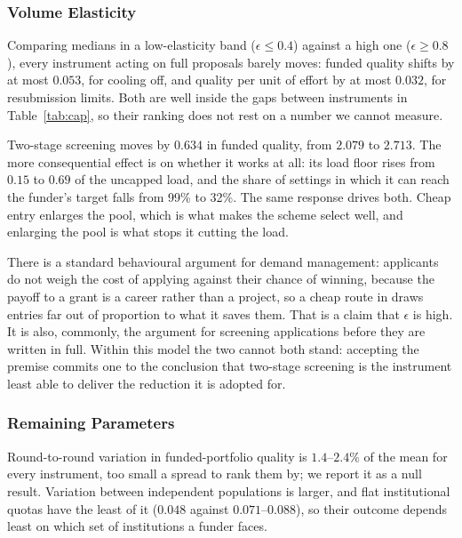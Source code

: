\documentclass[11pt,a4paper]{article}
\begin{document}
\subsubsection{Volume Elasticity}

Comparing medians in a low-elasticity band ($\epsilon \le 0.4$) against a high one
($\epsilon \ge 0.8$), every instrument acting on full proposals barely moves:
funded quality shifts by at most $0.053$, for cooling off, and quality per unit of
effort by at most $0.032$, for resubmission limits. Both are well inside the gaps
between instruments in Table~\ref{tab:cap}, so their ranking does not rest on a
number we cannot measure.

Two-stage screening moves by $0.634$ in funded quality, from $2.079$ to $2.713$.
The more consequential effect is on whether it works at all: its load floor rises
from $0.15$ to $0.69$ of the uncapped load, and the share of settings in which it
can reach the funder's target falls from 99\% to 32\%. The same response drives
both. Cheap entry enlarges the pool, which is what makes the scheme select well,
and enlarging the pool is what stops it cutting the load.

There is a standard behavioural argument for demand management: applicants do not
weigh the cost of applying against their chance of winning, because the payoff to
a grant is a career rather than a project, so a cheap route in draws entries far
out of proportion to what it saves them. That is a claim that $\epsilon$ is high.
It is also, commonly, the argument for screening applications before they are
written in full. Within this model the two cannot both stand: accepting the
premise commits one to the conclusion that two-stage screening is the instrument
least able to deliver the reduction it is adopted for.

\subsubsection{Remaining Parameters}

Round-to-round variation in funded-portfolio quality is $1.4$--$2.4\%$ of the mean
for every instrument, too small a spread to rank them by; we report it as a null
result. Variation between independent populations is larger, and flat
institutional quotas have the least of it ($0.048$ against $0.071$--$0.088$), so
their outcome depends least on which set of institutions a funder faces.
\end{document}
